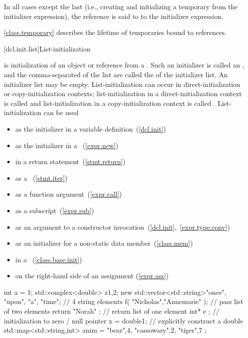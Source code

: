 In all cases except the last (i.e., creating and initializing a temporary from the
initializer expression), the reference is said to  to the
initializer expression.

\pnum
\enternote
\ref{class.temporary} describes the lifetime of temporaries bound to references.
\exitnote

[dcl.init.list]{List-initialization}%

\pnum
{} is initialization of an object or reference from a
. Such an initializer is called an , and the comma-separated  of the list are
called the  of the initializer list. An initializer list may be empty.
List-initialization can occur in direct-initialization or copy-initialization contexts;
list-initialization in a direct-initialization context is called
 and list-initialization in a
copy-initialization context is called . \enternote
List-initialization can be used

\begin{itemize}
\item as the initializer in a variable definition~(\ref{dcl.init})
\item as the initializer in a ~(\ref{expr.new})
\item in a return statement~(\ref{stmt.return})
\item as a ~(\ref{stmt.iter})
\item as a function argument~(\ref{expr.call})
\item as a subscript~(\ref{expr.sub})
\item as an argument to a constructor invocation~(\ref{dcl.init},~\ref{expr.type.conv})
\item as an initializer for a non-static data member~(\ref{class.mem})
\item in a ~(\ref{class.base.init})
\item on the right-hand side of an assignment (\ref{expr.ass})
\end{itemize}

\enterexample
\begin{codeblock}
int a = {1};
std::complex<double> z{1,2};
new std::vector<std::string>{"once", "upon", "a", "time"};  // 4 string elements
f( {"Nicholas","Annemarie"} );  // pass list of two elements
return { "Norah" };             // return list of one element
int* e {};                      // initialization to zero / null pointer
x = double{1};                  // explicitly construct a double 
std::map<std::string,int> anim = { {"bear",4}, {"cassowary",2}, {"tiger",7} };
\end{codeblock}
\exitexample \exitnote

